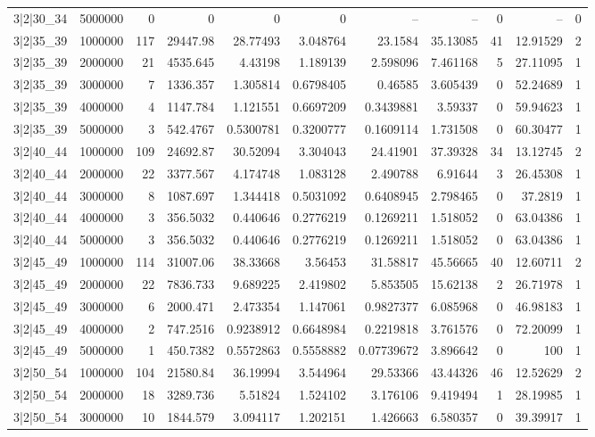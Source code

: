 \begin{tabular}{lrrrrrrrrrr}
3|2|30\_34 & 5000000 & 0 & 0 & 0 & 0 & -- & -- & 0 & -- & 0 \\
3|2|35\_39 & 1000000 & 117 & 29447.98 & 28.77493 & 3.048764 & 23.1584 & 35.13085 & 41 & 12.91529 & 2 \\
3|2|35\_39 & 2000000 & 21 & 4535.645 & 4.43198 & 1.189139 & 2.598096 & 7.461168 & 5 & 27.11095 & 1 \\
3|2|35\_39 & 3000000 & 7 & 1336.357 & 1.305814 & 0.6798405 & 0.46585 & 3.605439 & 0 & 52.24689 & 1 \\
3|2|35\_39 & 4000000 & 4 & 1147.784 & 1.121551 & 0.6697209 & 0.3439881 & 3.59337 & 0 & 59.94623 & 1 \\
3|2|35\_39 & 5000000 & 3 & 542.4767 & 0.5300781 & 0.3200777 & 0.1609114 & 1.731508 & 0 & 60.30477 & 1 \\
3|2|40\_44 & 1000000 & 109 & 24692.87 & 30.52094 & 3.304043 & 24.41901 & 37.39328 & 34 & 13.12745 & 2 \\
3|2|40\_44 & 2000000 & 22 & 3377.567 & 4.174748 & 1.083128 & 2.490788 & 6.91644 & 3 & 26.45308 & 1 \\
3|2|40\_44 & 3000000 & 8 & 1087.697 & 1.344418 & 0.5031092 & 0.6408945 & 2.798465 & 0 & 37.2819 & 1 \\
3|2|40\_44 & 4000000 & 3 & 356.5032 & 0.440646 & 0.2776219 & 0.1269211 & 1.518052 & 0 & 63.04386 & 1 \\
3|2|40\_44 & 5000000 & 3 & 356.5032 & 0.440646 & 0.2776219 & 0.1269211 & 1.518052 & 0 & 63.04386 & 1 \\
3|2|45\_49 & 1000000 & 114 & 31007.06 & 38.33668 & 3.56453 & 31.58817 & 45.56665 & 40 & 12.60711 & 2 \\
3|2|45\_49 & 2000000 & 22 & 7836.733 & 9.689225 & 2.419802 & 5.853505 & 15.62138 & 2 & 26.71978 & 1 \\
3|2|45\_49 & 3000000 & 6 & 2000.471 & 2.473354 & 1.147061 & 0.9827377 & 6.085968 & 0 & 46.98183 & 1 \\
3|2|45\_49 & 4000000 & 2 & 747.2516 & 0.9238912 & 0.6648984 & 0.2219818 & 3.761576 & 0 & 72.20099 & 1 \\
3|2|45\_49 & 5000000 & 1 & 450.7382 & 0.5572863 & 0.5558882 & 0.07739672 & 3.896642 & 0 & 100 & 1 \\
3|2|50\_54 & 1000000 & 104 & 21580.84 & 36.19994 & 3.544964 & 29.53366 & 43.44326 & 46 & 12.52629 & 2 \\
3|2|50\_54 & 2000000 & 18 & 3289.736 & 5.51824 & 1.524102 & 3.176106 & 9.419494 & 1 & 28.19985 & 1 \\
3|2|50\_54 & 3000000 & 10 & 1844.579 & 3.094117 & 1.202151 & 1.426663 & 6.580357 & 0 & 39.39917 & 1 \\

\end{tabular}
